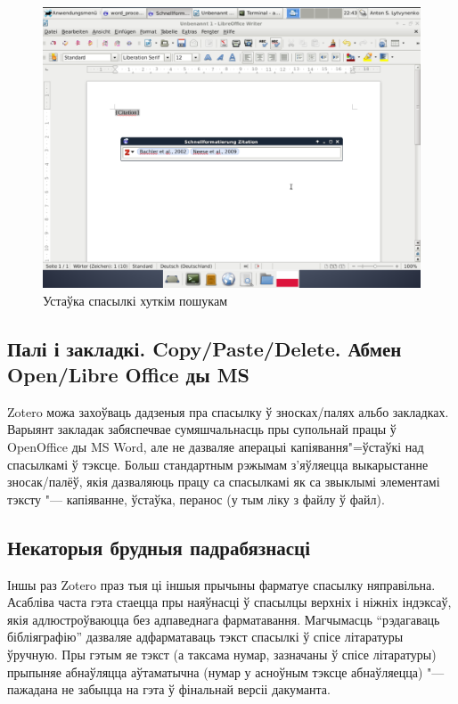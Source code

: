 \documentclass[10pt, a5paper]{article}
\begin{document}
\begin{figure}[h!]
  \centering
  \includegraphics[scale=0.2]{11_2014_Fig3.png}
  \caption{Устаўка спасылкі хуткім пошукам}
\end{figure}

\subsection*{Палі і закладкі. Copy/Paste/Delete. Абмен \linebreak Open/Libre Office ды MS}

Zotero можа захоўваць дадзеныя пра спасылку ў зносках/палях альбо закладках. Варыянт закладак забяспечвае сумяшчальнасць пры супольнай працы ў OpenOffice ды MS Word, але не дазваляе аперацыі капіявання"=ўстаўкі над спасылкамі ў тэксце. Больш стандартным рэжымам з’яўляецца выкарыстанне зносак/палёў, якія дазваляюць працу са спасылкамі як са звыклымі элементамі тэксту "--- капіяванне, ўстаўка, перанос (у тым ліку з файлу ў файл).

\subsection*{Некаторыя брудныя падрабязнасці}

Іншы раз Zotero праз тыя ці іншыя прычыны фарматуе спасылку няправільна. Асабліва часта гэта стаецца пры наяўнасці ў спасылцы верхніх і ніжніх індэксаў, якія адлюстроўваюцца без адпаведнага фарматавання. Магчымасць ``рэдагаваць бібліяграфію'' дазваляе адфарматаваць тэкст спасылкі ў спісе літаратуры ўручную. Пры гэтым яе тэкст (а таксама нумар, зазначаны ў спісе літаратуры) прыпыняе абнаўляцца аўтаматычна (нумар у асноўным тэксце абнаўляецца) "--- пажадана не забыцца на гэта ў фінальнай версіі дакуманта.
\end{document}
